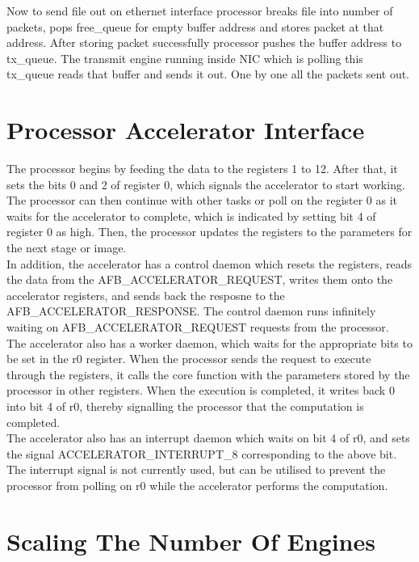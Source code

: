 \documentclass[12pt]{report}
\begin{document}
Now to send file out on ethernet interface processor breaks file into number of packets, pops free\_queue for empty buffer address and stores packet at that address. After storing packet successfully processor pushes the buffer address to tx\_queue. The transmit engine running inside NIC which is polling this tx\_queue reads that buffer and sends it out. One by one all the packets sent out.



\section{Processor Accelerator Interface}

The processor begins by feeding the data to the registers 1 to 12. After that, it sets the bits 0 and 2 of register 0, which signals the accelerator to start working. The processor can then continue with other tasks or poll on the register 0 as it waits for the accelerator to complete, which is indicated by setting bit 4 of register 0 as high. Then, the processor updates the registers to the parameters for the next stage or image.
\\

In addition, the accelerator has a control daemon which resets the registers, reads the data from the AFB\_ACCELERATOR\_REQUEST, writes them onto the accelerator registers, and sends back the resposne to the AFB\_ACCELERATOR\_RESPONSE. The control daemon runs infinitely waiting on AFB\_ACCELERATOR\_REQUEST requests from the processor.
\\

The accelerator also has a worker daemon, which waits for the appropriate bits to be set in the r0 register. When the processor sends the request to execute through the registers, it calls the core function with the parameters stored by the processor in other registers. When the execution is completed, it writes back 0 into bit 4 of r0, thereby signalling the processor that the computation is completed.
\\

The accelerator also has an interrupt daemon which waits on bit 4 of r0, and sets the signal ACCELERATOR\_INTERRUPT\_8 corresponding to the above bit. The interrupt signal is not currently used, but can be utilised to prevent the processor from polling on r0 while the accelerator performs the computation.
\\


\section{Scaling The Number Of Engines}\label{sec:scale_eng}
\end{document}
